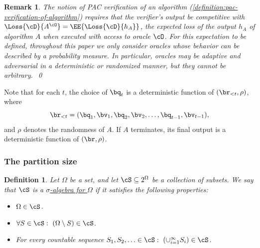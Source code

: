 \documentclass[11pt]{article}
\newtheorem{definition}[theorem]{Definition}
\newtheorem{remark}[theorem]{Remark}
\begin{document}
\begin{remark}
	The notion of PAC verification of an algorithm (\cref{definition:pac-verification-of-algorithm}) requires that the verifier's output be competitive with $\Loss{\cD}{A^\cO} = \EE{\Loss{\cD}{h_A}}$, the expected loss of the output $h_A$ of algorithm $A$ when executed with access to oracle $\cO$. For this expectation to be defined, throughout this paper we only consider oracles whose behavior can be described by a probability measure. In particular, oracles may be adaptive and adversarial in a deterministic or randomized manner, but they cannot be arbitrary.~\qed
\end{remark}


Note that for each $t$, the choice of $\bq_t$ is a deterministic function of $(\br_{< t},\rho)$, where 
\[
	\br_{< t} = (\bq_1,\bv_1,\bq_2,\bv_2,\dots,\bq_{t-1},\bv_{t-1}),
\]
and $\rho$ denotes the randomness of $A$. If $A$ terminates, its final output is a deterministic function of $(\br,\rho)$.

\subsubsection{The partition size}

\begin{definition}
	Let $\Omega$ be a set, and let $\cS \subseteq 2^\Omega$ be a collection of subsets. We say that $\cS$ is a \ul{$\sigma$-algebra for $\Omega$} if it satisfies the following properties:
	\begin{itemize}
		\item{$\Omega \in \cS$.}
		\item{$\forall S \in \cS: ~ (\Omega \setminus S) \in \cS$.}
		\item{For every countable sequence $S_1,S_2,\ldots \in \cS: ~ \left(\cup_{i=1}^\infty S_i\right) \in \cS$.}
	\end{itemize}
\end{definition}
\end{document}
